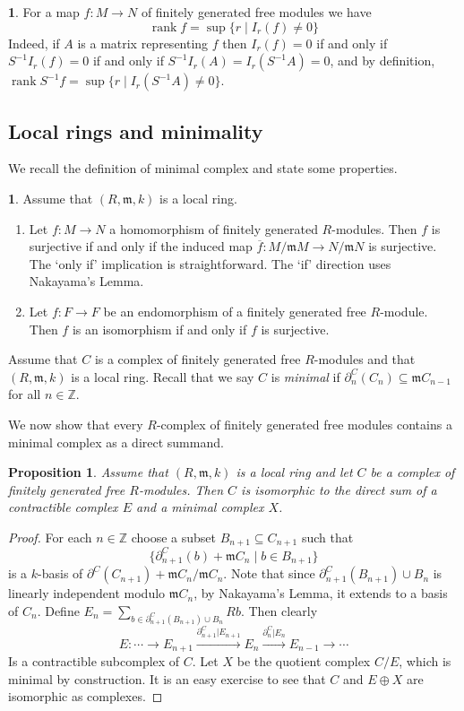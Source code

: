 \documentclass{amsart}[11pt]
\newcommand{\m}{{\mathfrak m}}
\newcommand{\rank}{\operatorname{rank}}
\numberwithin{equation}{section}
\theoremstyle{plain}
\newtheorem*{Main Theorem}{Main Theorem}
\newtheorem{proposition}[theorem]{Proposition}
\theoremstyle{definition}
\newtheorem{chunk}[theorem]{}
\theoremstyle{remark}
\numberwithin{equation}{theorem}
\begin{document}
\begin{chunk}\label{maprank}
For a map $f:M\to N$ of finitely generated free modules we have
\[
\rank f=\sup\{r\mid I_r(f)\ne 0\}
\]
Indeed, if $A$ is a matrix representing $f$ then $I_r(f)=0$ if and only if $S^{-1}I_r(f)=0$ if and only if $S^{-1}I_r(A)=I_r(S^{-1}A)=0$, and by definition, 
$\rank S^{-1}f=\sup\{r\mid I_r(S^{-1}A)\ne 0\}$.
\end{chunk}

\subsection*{Local rings and minimality} We recall the definition of minimal complex and state some properties.

\begin{chunk}\label{surjective1} Assume that $(R,\m,k)$ is a local ring.
\begin{enumerate}
\item  Let $f:M\to N$ a homomorphism of 
finitely generated $R$-modules.  Then $f$ is surjective if and only if the induced map $\overline f:M/\m M\to N/\m N$ is surjective. The `only if' implication is straightforward.  The `if' direction uses Nakayama's Lemma.
\item Let $f:F\to F$ be an endomorphism of a finitely generated free $R$-module.  Then $f$ is an isomorphism if and only if $f$ is surjective.
\end{enumerate}
\end{chunk}

Assume that $C$ is a complex of finitely generated free $R$-modules and that $(R,\m,k)$ is a local ring.
Recall that we say $C$ is \emph{minimal} if $\partial^C_n(C_n)\subseteq\m C_{n-1}$ for all 
$n\in\mathbb Z$.

We now show that every $R$-complex of finitely generated free modules contains a minimal complex as a direct summand.

\begin{proposition}\label{directsum} Assume that $(R,\m,k)$ is a local ring and let $C$ be a complex of finitely generated free $R$-modules.  Then $C$ is isomorphic to the direct sum of a contractible complex $E$ and a minimal complex $X$.
\end{proposition}

\begin{proof} For each $n\in\mathbb Z$ choose a subset $B_{n+1}\subseteq C_{n+1}$ such that 
\[
\{\partial^C_{n+1}(b)+\m C_n\mid b\in B_{n+1}\}
\] 
is a $k$-basis of $\partial^C(C_{n+1})+\m C_n/\m C_n$. Note that since $\partial_{n+1}^C(B_{n+1})\cup B_n$ is 
linearly independent modulo $\m C_n$, by Nakayama's Lemma, it extends to a basis of $C_n$. Define
$E_n=\sum_{b\in\partial_{n+1}^C(B_{n+1})\cup B_n}Rb$.  Then clearly
\[
E: \cdots \to E_{n+1}\xrightarrow{\partial^C_{n+1}|E_{n+1}} E_n \xrightarrow{\partial^C_n|E_n} E_{n-1} \to \cdots
\]
Is a contractible subcomplex of $C$. Let $X$ be the quotient complex $C/E$, which is minimal by construction. It is an easy exercise to see that $C$ and $E\oplus X$ are isomorphic as complexes.
\end{proof}
\end{document}

